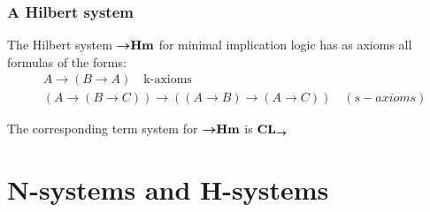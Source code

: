 \documentclass[11pt]{article}
\begin{document}
\subsubsection{A Hilbert system}
\label{sec:org8daa0d2}
The Hilbert system \({\boldsymbol{\to}}\textbf{Hm}\) for minimal implication logic has as axioms all
formulas of the forms:
\begin{align*}
&A\to (B\to A)\quad\text{k-axioms}\\
&(A\to(B\to C))\to((A\to B)\to(A\to C))\quad(s-axioms)
\end{align*}

The corresponding term system for \({\boldsymbol{\to}}\textbf{Hm}\) is \(\operatorname{\textbf{CL}}_{\boldsymbol{\to}}\)
\section{N-systems and H-systems}
\label{sec:org372a2f8}
\end{document}

